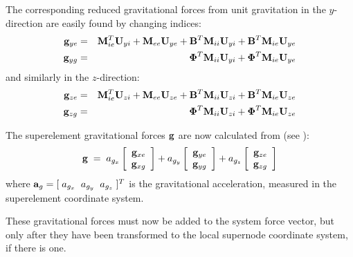 {The corresponding reduced gravitational forces from unit gravitation in the
$y$-direction are easily found by changing indices:
%
\begin{eqnarray}
{\mf g}_{ye} &=& {\mf M}_{ie}^T {\mf U}_{yi} +
{\mf M}_{ee} {\mf U}_{ye} + {\mf B}^T {\mf M}_{ii}{\mf U}_{yi} +
{\mf B}^T {\mf M}_{ie} {\mf U}_{ye}
\label{eqK35:6} \\
%
{\mf g}_{yg} &=& {\bs\Phi}^T {\mf M}_{ii}{\mf U}_{yi} +
{\bs \Phi}^T {\mf M}_{ie}{\mf U}_{ye}
\label{eqK35:7}
\end{eqnarray}
%
and similarly in the $z$-direction:
%
\begin{eqnarray}
{\mf g}_{ze} &=& {\mf M}_{ie}^T {\mf U}_{zi} +
{\mf M}_{ee} {\mf U}_{ze} + {\mf B}^T {\mf M}_{ii}{\mf U}_{zi} +
{\mf B}^T  {\mf M}_{ie} {\mf U}_{ze}
\label{eqK35:8} \\
%
{\mf g}_{zg} &=& {\bs\Phi}^T {\mf M}_{ii}{\mf U}_{zi} +
{\bs \Phi}^T {\mf M}_{ie}{\mf U}_{ze}
\label{eqK35:9}
\end{eqnarray}

The superelement gravitational forces ${\bf g}$ are now calculated from
(see ):
%
\begin{equation}
{\bf g} \;=\; a_{g_x}
\left[\begin{array}{cc}
{\bf g}_{xe} \\ {\bf g}_{xg}
\end{array}\right] + a_{g_y}
\left[\begin{array}{cc}
{\bf g}_{ye} \\ {\bf g}_{yg}
\end{array}
\right] + a_{g_z}
\left[\begin{array}{cc}
{\bf g}_{ze} \\ {\bf g}_{zg}
\end{array}\right]
\label{eqK35:11}
\end{equation}
%
where ${\bf a}_g = [\; a_{g_x} \;\; a_{g_y} \;\; a_{g_z}\;]^T$ is the
gravitational acceleration, measured in the superelement coordinate system.

These gravitational forces must now be added to the system force vector,
but only after they have been transformed to the local supernode coordinate
system, if there is one.

} %
